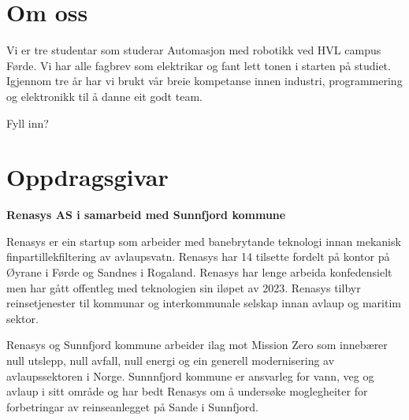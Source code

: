 
\thispagestyle{fancy}

\section{Om oss}

Vi er tre studentar som studerar Automasjon med robotikk ved HVL campus Førde.
Vi har alle fagbrev som elektrikar og fant lett tonen i starten på studiet.
Igjennom tre år har vi brukt vår breie kompetanse innen industri, programmering og elektronikk
til å danne eit godt team.

Fyll inn?


\section{Oppdragsgivar}
\textbf{Renasys AS i samarbeid med Sunnfjord kommune}

Renasys er ein startup som arbeider med banebrytande teknologi innan mekanisk finpartillekfiltering av avlaupsvatn.
Renasys har 14 tilsette fordelt på kontor på Øyrane i Førde og Sandnes i Rogaland. Renasys har lenge arbeida konfedensielt men har gått offentleg med teknologien sin iløpet av 2023. Renasys tilbyr reinsetjenester til kommunar og interkommunale selskap innan avlaup og maritim sektor.

Renasys og Sunnfjord kommune arbeider ilag mot Mission Zero som innebærer null utslepp, null avfall, null energi og ein generell modernisering av avlaupssektoren i Norge.
Sunnnfjord kommune er ansvarleg for vann, veg og avlaup i sitt område og har bedt Renasys om å undersøke moglegheiter for forbetringar av reinseanlegget på Sande i Sunnfjord.